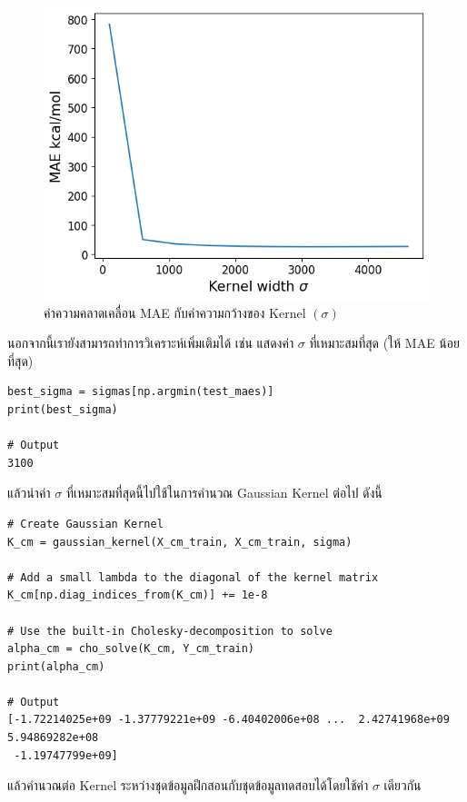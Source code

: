 \begin{figure}[H]
    \centering
    \includegraphics[width=0.9\linewidth]{fig/qm9_cm_mae_sigma.png}
    \caption{ค่าความคลาดเคลื่อน MAE กับค่าความกว้างของ Kernel $(\sigma)$}
    \label{fig:qm9_cm_kernel_mae}
\end{figure}

นอกจากนี้เรายังสามารถทำการวิเคราะห์เพิ่มเติมได้ เช่น แสดงค่า $\sigma$ ที่เหมาะสมที่สุด (ให้ MAE น้อยที่สุด)

\begin{lstlisting}[style=MyPython]
best_sigma = sigmas[np.argmin(test_maes)]
print(best_sigma)

# Output
3100
\end{lstlisting}

\vspace{1em}
\noindent แล้วนำค่า $\sigma$ ที่เหมาะสมที่สุดนี้ไปใช้ในการคำนวณ Gaussian Kernel ต่อไป ดังนี้

\begin{lstlisting}[style=MyPython]
# Create Gaussian Kernel
K_cm = gaussian_kernel(X_cm_train, X_cm_train, sigma)

# Add a small lambda to the diagonal of the kernel matrix
K_cm[np.diag_indices_from(K_cm)] += 1e-8

# Use the built-in Cholesky-decomposition to solve
alpha_cm = cho_solve(K_cm, Y_cm_train)
print(alpha_cm)

# Output
[-1.72214025e+09 -1.37779221e+09 -6.40402006e+08 ...  2.42741968e+09  5.94869282e+08
 -1.19747799e+09]
\end{lstlisting}

\vspace{1em}
\noindent แล้วคำนวณต่อ Kernel ระหว่างชุดข้อมูลฝึกสอนกับชุดข้อมูลทดสอบได้โดยใช้ค่า $\sigma$ เดียวกัน

